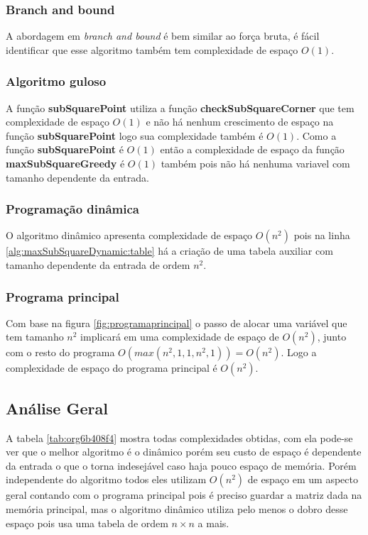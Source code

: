 \documentclass[10.9pt]{article}
\begin{document}
\subsubsection{Branch and bound}
\label{sec:orgb477a6b}
A abordagem em \emph{branch and bound} é bem similar ao força bruta, é fácil identificar que esse algoritmo também tem complexidade de espaço \(O(1)\).

\subsubsection{Algoritmo guloso}
\label{sec:org29b7bb9}
A função \textbf{subSquarePoint} utiliza a função \textbf{checkSubSquareCorner} que tem complexidade de espaço \(O(1)\) e não há nenhum crescimento de espaço na função \textbf{subSquarePoint} logo sua complexidade também é \(O(1)\).
Como a função \textbf{subSquarePoint} é \(O(1)\) então a complexidade de espaço da função \textbf{maxSubSquareGreedy} é \(O(1)\) também pois não há nenhuma variavel com tamanho dependente da entrada.
\subsubsection{Programação dinâmica}
\label{sec:org123977e}
O algoritmo dinâmico apresenta complexidade de espaço \(O(n^2)\) pois na linha \ref{alg:maxSubSquareDynamic:table} há a criação de uma tabela auxiliar com tamanho dependente da entrada de ordem \(n^2\).
\subsubsection{Programa principal}
\label{sec:org98651e4}
Com base na figura \ref{fig:programaprincipal} o passo de alocar uma variável que tem tamanho \(n^2\) implicará em uma complexidade de espaço de \(O(n^2)\), junto com o resto do programa \(O(max(n^2,1,1,n^2,1)) = O(n^2)\). Logo a complexidade de espaço do programa principal é \(O(n^2)\).


\subsection{Análise Geral}
\label{sec:orgf080b3f}
A tabela \ref{tab:org6b408f4} mostra todas complexidades obtidas, com ela pode-se ver que o melhor algoritmo é o dinâmico porém seu custo de espaço é dependente da entrada o que o torna indesejável caso haja pouco espaço de memória. Porém independente do algoritmo todos eles utilizam \(O(n^2)\) de espaço em um aspecto geral contando com o programa principal pois é preciso guardar a matriz dada na memória principal, mas o algoritmo dinâmico utiliza pelo menos o dobro desse espaço pois usa uma tabela de ordem \(n\times n\) a mais.
\end{document}
